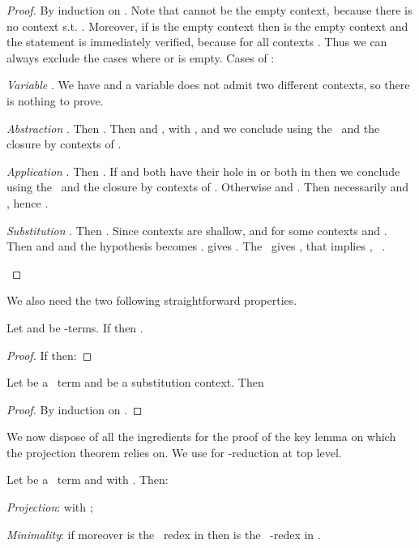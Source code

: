 \begin{proof}
 By induction on . Note that  cannot be the empty context, because there is no context  s.t. . Moreover, if  is the empty context then  is the empty context and the statement is immediately verified, because  for all contexts . Thus we can always exclude the cases where  or  is empty. Cases of :
	\begin{varenumerate}
		\item \emph{Variable }. We have  and a variable does not admit two different contexts, so there is nothing to prove.
		
		\item \emph{Abstraction }. Then . Then  and , with , and we conclude using the \ih\ and the closure by contexts of .
		
		\item \emph{Application }. Then . If  and  both have their hole in  or both in  then we conclude using the \ih\ and the closure by contexts of . Otherwise  and . Then necessarily  and , hence .
		
		\item \emph{Substitution }. Then . Since contexts are shallow,  and  for some contexts  and . Then  and  and the hypothesis becomes .  gives . The \ih\ gives , that implies , \ie\ .
	\end{varenumerate}
\end{proof}


We also need the two following straightforward properties.

\begin{lemma}
\label{l:beta-sub-left}
Let  and  be -terms. If  then .
\end{lemma}


\begin{proof}
If  then:

\end{proof}


\begin{lemma}
\label{l:rel-unf-and-sub-commute}
Let  be a \lsc\ term and  be a substitution context. Then 
\end{lemma}

\begin{proof}
By induction on .
\end{proof}


We now dispose of all the ingredients for the proof of the key lemma on which the projection theorem relies on. We use  for -reduction at top level.

\begin{lemma}
	\label{l:useful-projection}

	Let  be a \lsc\ term and  with . Then:
	\begin{varenumerate}

		\item \emph{Projection}:  with ;

		\item \emph{Minimality}: if moreover  is the \lou\ redex in  then  is the \lo\ -redex in .
	\end{varenumerate}
\end{lemma}

